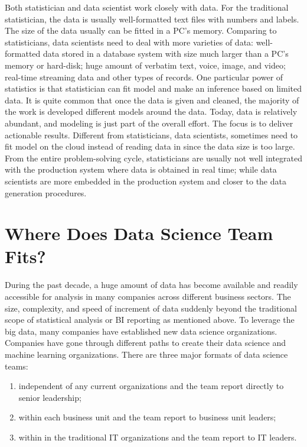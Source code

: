 \documentclass[12pt,]{krantz}
\providecommand{\tightlist}{%
  \setlength{\itemsep}{0pt}\setlength{\parskip}{0pt}}
\theoremstyle{definition}
\theoremstyle{definition}
\theoremstyle{definition}
\theoremstyle{remark}
\begin{document}
Both statistician and data scientist work closely with data. For the
traditional statistician, the data is usually well-formatted text files
with numbers and labels. The size of the data usually can be fitted in a
PC's memory. Comparing to statisticians, data scientists need to deal
with more varieties of data: well-formatted data stored in a database
system with size much larger than a PC's memory or hard-disk; huge
amount of verbatim text, voice, image, and video; real-time streaming
data and other types of records. One particular power of statistics is
that statistician can fit model and make an inference based on limited
data. It is quite common that once the data is given and cleaned, the
majority of the work is developed different models around the data.
Today, data is relatively abundant, and modeling is just part of the
overall effort. The focus is to deliver actionable results. Different
from statisticians, data scientists, sometimes need to fit model on the
cloud instead of reading data in since the data size is too large. From
the entire problem-solving cycle, statisticians are usually not well
integrated with the production system where data is obtained in real
time; while data scientists are more embedded in the production system
and closer to the data generation procedures.

\section{Where Does Data Science Team
Fits?}\label{where-does-data-science-team-fits}

During the past decade, a huge amount of data has become available and
readily accessible for analysis in many companies across different
business sectors. The size, complexity, and speed of increment of data
suddenly beyond the traditional scope of statistical analysis or BI
reporting as mentioned above. To leverage the big data, many companies
have established new data science organizations. Companies have gone
through different paths to create their data science and machine
learning organizations. There are three major formats of data science
teams:

\begin{enumerate}
\def\labelenumi{(\arabic{enumi})}
\tightlist
\item
  independent of any current organizations and the team report directly
  to senior leadership;\\
\item
  within each business unit and the team report to business unit
  leaders;\\
\item
  within in the traditional IT organizations and the team report to IT
  leaders.
\end{enumerate}
\end{document}
